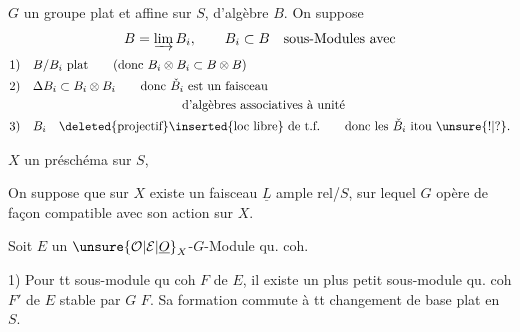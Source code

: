 $G$ un groupe plat et affine sur $S$,
d'algèbre $B$. On suppose
\[
B=\varinjlim B_i,\qquad B_i\subset B\quad\text{sous-Modules avec}
\]
\[
\begin{aligned}
1)\quad &B/B_i\ \text{plat}\qquad(\text{donc }B_i\otimes B_i\subset B\otimes B)\\
2)\quad &\Delta B_i\subset B_i\otimes B_i\qquad\text{donc }\check B_i\text{ est un faisceau}\\
&\hspace{12em}\text{d'algèbres associatives à unité}\\
3)\quad &B_i\quad\text{\deleted{projectif}\inserted{loc libre} de t.f.}\qquad\text{donc les }\check B_i\text{ itou \unsure{!|?}.}
\end{aligned}
\]

$X$ un préschéma sur $S$,  

 On suppose que sur $X$ existe un
faisceau  $\underline L$ ample rel/$S$, sur lequel $G$
opère de façon compatible avec son action sur $X$.

Soit $E$ un $\unsure{\mathcal{O}|\mathcal{E}|\underline{O}}_X$-$G$-Module qu. coh. 

1) Pour tt sous-module qu coh $F$ de $E$,
il existe un plus petit sous-module qu.
coh $F'$ de $E$  stable par $G$  $F$.
Sa  formation commute à
tt changement de base plat en $S$.

